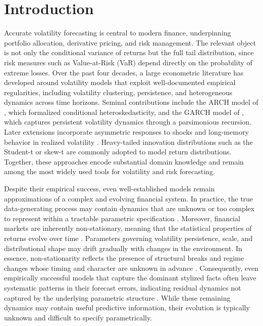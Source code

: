 \section{Introduction}\label{sec:Introduction}

Accurate volatility forecasting is central to modern finance, underpinning portfolio allocation, derivative pricing, and risk management. The relevant object is not only the conditional variance of returns but the full tail distribution, since risk measures such as Value-at-Risk (VaR) depend directly on the probability of extreme losses. Over the past four decades, a large econometric literature has developed around volatility models that exploit well-documented empirical regularities, including volatility clustering, persistence, and heterogeneous dynamics across time horizons. Seminal contributions include the ARCH model of \citet{engle1982autoregressive}, which formalized conditional heteroskedasticity, and the GARCH model of \citet{Bollerslev1986}, which captures persistent volatility dynamics through a parsimonious recursion. Later extensions incorporate asymmetric responses to shocks \citep{Glosten1993} and long-memory behavior in realized volatility \citep{corsi2009simple}. Heavy-tailed innovation distributions such as the Student-t or skew-t \citep{bollerslev1987conditionally, Hansen1994} are commonly adopted to model return distributions. Together, these approaches encode substantial domain knowledge and remain among the most widely used tools for volatility and risk forecasting.

Despite their empirical success, even well-established models remain approximations of a complex and evolving financial system. In practice, the true data-generating process may contain dynamics that are unknown or too complex to represent within a tractable parametric specification \citep{poon2003forecasting, Rossi2021}. Moreover, financial markets are inherently non-stationary, meaning that the statistical properties of returns evolve over time \citep{StockWatson1996, Rossi2013}. Parameters governing volatility persistence, scale, and distributional shape may drift gradually with changes in the environment. In essence, non-stationarity reflects the presence of structural breaks and regime changes whose timing and character are unknown in advance \citep{clements2011forecastingbreaks, Rossi2013}. Consequently, even empirically successful models that capture the dominant stylized facts often leave systematic patterns in their forecast errors, indicating residual dynamics not captured by the underlying parametric structure \citep{poon2003forecasting}. While these remaining dynamics may contain useful predictive information, their evolution is typically unknown and difficult to specify parametrically.

